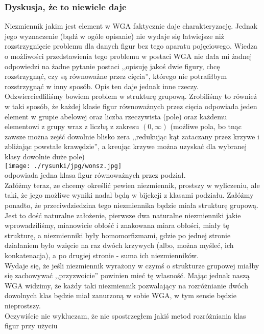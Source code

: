 \documentclass[a4paper, 12pt, twosided]{article}
\newcommand{\rysunek}[1]{\hfill \break\\[16pt] \Huge \textbf{\textcolor{violet}{Brakujący rysunek 
\normalsize
#1}} \hfill
\break \\[16pt] \normalsize}
\begin{document}
\subsubsection{Dyskusja, że to niewiele daje}
Niezmiennik jakim jest element w WGA faktycznie daje charakteryzację. Jednak jego wyznaczenie (bądź 
w 
ogóle
opisanie) nie wydaje się łatwiejsze niż rozstrzygnięcie problemu dla danych figur bez tego aparatu
pojęciowego. Wiedza o możliwości przedstawienia tego problemu w postaci WGA nie dała mi żadnej 
odpowiedzi
na żadne pytanie postaci ,,opisuję jakoś dwie figury, chcę rozstrzygnąć, czy są równoważne przez 
cięcia'',
którego nie potrafiłbym rozstrzygnąć w inny sposób. Opis ten daje jednak inne rzeczy.\\
Odzwierciedliliśmy bowiem problem w strukturę grupową. Zrobiliśmy to również w taki sposób, że 
każdej klasie
figur równoważnych przez cięcia odpowiada jeden element w grupie abelowej oraz liczba rzeczywista 
(pole)
oraz każdemu elementowi z grupy wraz z liczbą z zakresu $(0, \infty)$ (możliwe pola, bo tnąc zawsze 
można
zejść dowolnie blisko zera ,,redukując kąt zataczany przez krzywe i zbliżając powstałe krawędzie'', 
a
kreując krzywe można uzyskać dla wybranej klasy dowolnie duże pole) \\
\texttt{[image: ./rysunki/jpg/wonsz.jpg]} \\
odpowiada jedna klasa figur równoważnych przez podział. \\
Załóżmy teraz, ze chcemy określić pewien niezmiennik, prostszy w wyliczeniu, ale taki, że jego 
możliwe wyniki
nadal będą w bijekcji z klasami podziału. Załóżmy ponadto, że przeciwdziedzina tego niezmiennika 
będzie miała
strukturę grupową. Jest to dość naturalne założenie, pierwsze dwa naturalne niezmienniki jakie 
wprowadziliśmy, mianowicie obłość i znakowana miara obłości, miały tę strukturę, a niezmienniki 
 były 
homomorfizmami,
gdzie po jednej stronie działaniem było wzięcie na raz dwóch krzywych (albo, można myśleć, ich 
konkatenacja),
a po drugiej stronie - suma ich niezmienników. \\
Wydaje się, że jeśli niezmiennik wyrażony w czymś o strukturze grupowej miałby się zachowywać 
,,przyzwoicie''
powinien mieć tę własność. Mając jednak naszą WGA widzimy, że każdy taki niezmiennik pozwalający na
rozróżnianie dwóch dowolnych klas 
będzie miał zanurzoną w sobie WGA, w tym sensie 
będzie
nieprostszy. \\
Oczywiście nie wykluczam, że nie spostrzegłem jakiś metod rozróżniania klas figur przy użyciu 
\end{document}
